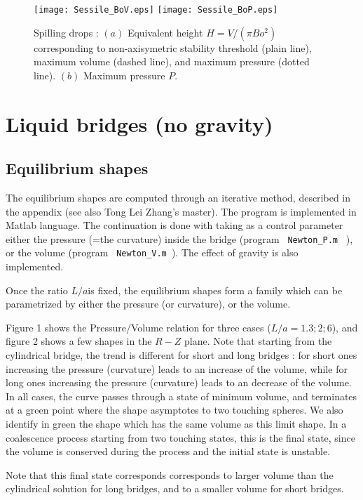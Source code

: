 \begin{figure}
\texttt{[image: Sessile\_BoV.eps]}
\texttt{[image: Sessile\_BoP.eps]} 
\caption{
Spilling drops : $(a)$ Equivalent height $H = V/(\pi Bo^2)$ corresponding to non-axisymetric stability threshold (plain line), maximum volume (dashed line), and maximum pressure (dotted line).
$(b)$ Maximum pressure $P$.
}
\end{figure}



\section{Liquid bridges (no gravity)}

\subsection{Equilibrium shapes}

The equilibrium shapes are computed through an iterative method, described in the appendix (see also Tong Lei Zhang's master). The program is implemented in Matlab language.
The continuation is done with taking as a control parameter either the pressure (=the curvature) inside the bridge (program \verb| Newton_P.m | ), or the volume (program \verb| Newton_V.m |).
The effect of gravity is also implemented.


Once the ratio $L/a$is fixed, the equilibrium shapes form a family which can be parametrized by either the pressure (or curvature), or the volume.

Figure 1 shows the Pressure/Volume relation for three cases ($L/a = 1.3 ; 2 ; 6$),
and figure 2 shows a few shapes in the $R-Z$ plane. Note that starting from the cylindrical bridge, the trend is different for short and long bridges : for short ones increasing the pressure (curvature) leads to an increase of the volume, while for long ones  increasing the pressure (curvature) leads to an decrease of the volume. In all cases, the curve passes through a state of minimum volume, and terminates at a green point where the shape asymptotes to two touching spheres.
We also identify in green the shape which has the same volume as this limit shape. In a coalescence process starting from two touching states, this is the final state, since the volume is conserved during the process and the initial state is unstable.

Note that this final state corresponds corresponds to larger volume than the cylindrical solution for long bridges, and to a smaller volume for short bridges.

